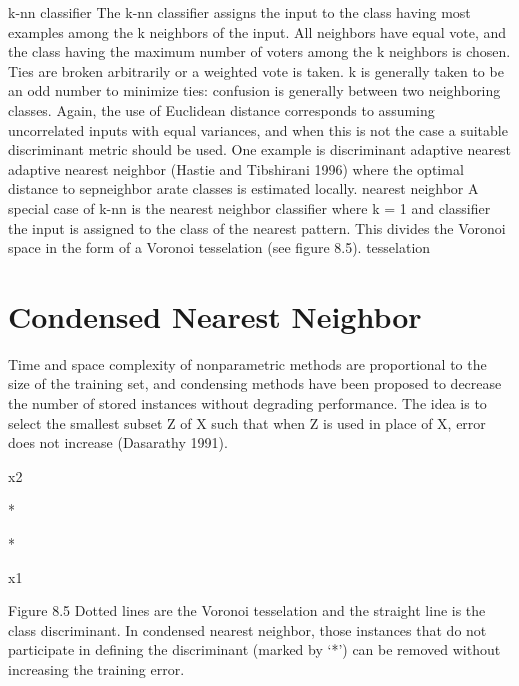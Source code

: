 k-nn classifier The k-nn classifier assigns the input to the class having most examples among the k neighbors of the input. All neighbors have equal vote, and the class having the maximum number of voters among the k neighbors is chosen. Ties are broken arbitrarily or a weighted vote is taken. k is generally taken to be an odd number to minimize ties: confusion is generally between two neighboring classes. Again, the use of Euclidean distance corresponds to assuming uncorrelated inputs with equal variances, and when this is not the case a suitable discriminant metric should be used. One example is discriminant adaptive nearest adaptive nearest neighbor (Hastie and Tibshirani 1996) where the optimal distance to sepneighbor arate classes is estimated locally. nearest neighbor A special case of k-nn is the nearest neighbor classifier where k = 1 and classifier the input is assigned to the class of the nearest pattern. This divides the Voronoi space in the form of a Voronoi tesselation (see figure 8.5). tesselation

\section{Condensed Nearest Neighbor}

Time and space complexity of nonparametric methods are proportional to the size of the training set, and condensing methods have been proposed to decrease the number of stored instances without degrading performance. The idea is to select the smallest subset Z of X such that when Z is used in place of X, error does not increase (Dasarathy 1991).

x2

*

*

x1

Figure 8.5 Dotted lines are the Voronoi tesselation and the straight line is the class discriminant. In condensed nearest neighbor, those instances that do not participate in defining the discriminant (marked by ‘*’) can be removed without increasing the training error.

